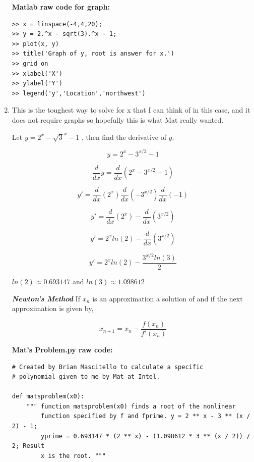 \documentclass[12pt]{article}
\begin{document}
\begin{enumerate}[label=\textbf{\arabic*}.]
\begin{minipage}{.3\linewidth}
\begin{tabular}{c | c}
\end{tabular}

\end{minipage}

\textbf{Matlab raw code for graph:}
\begin{verbatim}
>> x = linspace(-4,4,20);
>> y = 2.^x - sqrt(3).^x - 1;
>> plot(x, y)
>> title('Graph of y, root is answer for x.')
>> grid on
>> xlabel('X')
>> ylabel('Y')
>> legend('y','Location','northwest')
\end{verbatim}


\newpage

\item This is the toughest way to solve for x that I can think of in this case, and it does not require graphs so hopefully this is what Mat really wanted.

Let $y = 2^{x} - \sqrt{3}^x - 1$ , then find the derivative of $y$.

$$y = 2^{x} - 3^{x/2} - 1$$

$$\dfrac{d}{dx}y = \dfrac{d}{dx}(2^{x} - 3^{x/2} - 1)$$

$$y' = \dfrac{d}{dx}(2^{x}) \dfrac{d}{dx}(- 3^{x/2}) \dfrac{d}{dx}(- 1)$$

$$y' = \dfrac{d}{dx}(2^{x}) - \dfrac{d}{dx}(3^{x/2})$$

$$y' = 2^{x}ln(2) - \dfrac{d}{dx}(3^{x/2})$$

$$\boxed{y' = 2^{x}ln(2) - \dfrac{3^{x/2}ln(3)}{2}}$$

$ln(2) \approx 0.693147$ and $ln(3) \approx 1.098612$

\textbf{\textit{Newton's Method}}
\hspace{3 mm} If $x_n$ is an approximation a solution of  and if  the next approximation is given by,

$$x_{n+1} = x_n - \dfrac{f(x_n)}{f'(x_n)}$$

\newpage

\textbf{Mat's Problem.py raw code:}
\begin{verbatim}
# Created by Brian Mascitello to calculate a specific
# polynomial given to me by Mat at Intel.

def matsproblem(x0):
    """ function matsproblem(x0) finds a root of the nonlinear
        function specified by f and fprime. y = 2 ** x - 3 ** (x / 2) - 1;
        yprime = 0.693147 * (2 ** x) - (1.098612 * 3 ** (x / 2)) / 2; Result
        x is the root. """


\end{verbatim}
\end{enumerate}
\end{document}
